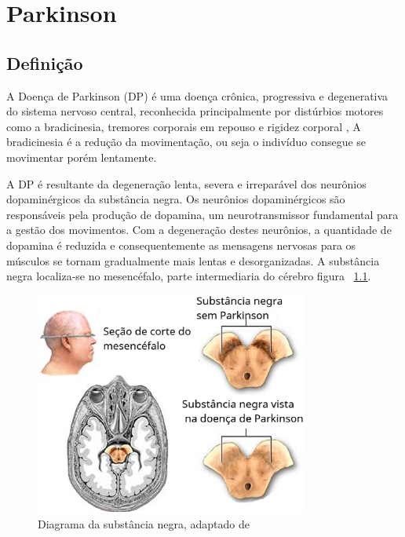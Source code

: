 \chapter{Parkinson}
\section{Definição}

A Doença de Parkinson (DP) é uma doença crônica, progressiva e degenerativa do sistema nervoso central, reconhecida principalmente por distúrbios motores como a bradicinesia, tremores corporais em repouso e rigidez corporal \cite{da2016aspectos}, A bradicinesia é a redução da movimentação, ou seja o indivíduo consegue se movimentar porém lentamente. 

A DP é resultante da degeneração lenta, severa e irreparável dos neurônios dopaminérgicos da substância negra. Os neurônios dopaminérgicos são responsáveis pela produção de dopamina, um neurotransmissor fundamental para a gestão dos movimentos. Com a degeneração destes neurônios, a quantidade de dopamina é reduzida e consequentemente as mensagens nervosas para os músculos se tornam gradualmente mais lentas e desorganizadas. A substância negra localiza-se no mesencéfalo, parte intermediaria do cérebro \cite{eftaxias2015detection} figura ~\ref{substanciaNegra}.

\begin{figure}[!htb]
	\centering
	\includegraphics[width=0.8\textwidth]{figuras/subNegra.eps}
	\caption{Diagrama da substância negra, adaptado de }
	\label{substanciaNegra}
\end{figure}

